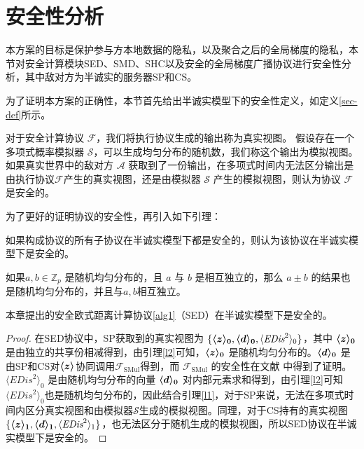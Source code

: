 \section{安全性分析}\label{4-analysis}
本方案的目标是保护参与方本地数据的隐私，以及聚合之后的全局梯度的隐私，本节对安全计算模块SED、SMD、SHC以及安全的全局梯度广播协议进行安全性分析，其中敌对方为半诚实的服务器SP和CS。

为了证明本方案的正确性，本节首先给出半诚实模型下的安全性定义，如定义\ref{sec-def}所示。

\begin{definition}\label{sec-def}	
	对于安全计算协议 $\mathcal{F}$，我们将执行协议生成的输出称为真实视图。
	假设存在一个多项式概率模拟器 $\mathcal{S}$，可以生成均匀分布的随机数，我们称这个输出为模拟视图。如果真实世界中的敌对方 $\mathcal{A}$ 获取到了一份输出，在多项式时间内无法区分输出是由执行协议$\mathcal{F}$产生的真实视图，还是由模拟器 $\mathcal{S}$ 产生的模拟视图，则认为协议 $\mathcal{F}$ 是安全的。
\end{definition}

为了更好的证明协议的安全性，再引入如下引理：
\begin{lemma}\label{l1}
	如果构成协议的所有子协议在半诚实模型下都是安全的，则认为该协议在半诚实模型下是安全的\cite{bi2020design}。
\end{lemma}

\begin{lemma}\label{l2}
	如果$ a, b \in \mathbb{Z}_p$ 是随机均匀分布的，且 $a$ 与 $b$ 是相互独立的，那么 $a \pm b$ 的结果也是随机均匀分布的，并且与$a,b$相互独立\cite{bogdanov2008sharemind}。
\end{lemma}

\begin{theorem}
	本章提出的安全欧式距离计算协议\ref{alg1}（SED）在半诚实模型下是安全的。
\end{theorem}

\begin{proof}\label{p1}
	在SED协议中，SP获取到的真实视图为 $\{\svec[0]{z}, \svec[0]{d}, \langle \textit{EDis}^2\rangle_0\}$，其中 $\svec[0]{z}$ 是由独立的共享份相减得到，由引理\ref{l2}可知，$\svec[0]{z}$ 是随机均匀分布的。$\svec[0]{d}$ 是由SP和CS对$\svec{z}$协同调用$\mathcal{F}_{\text {SMul}}$得到，而 $\mathcal{F}_{\text {SMul}}$ 的安全性在文献 \cite{rathee2021sirnn} 中得到了证明。$\langle \textit{EDis}^2\rangle_0$ 是由随机均匀分布的向量 $\svec[0]{d}$ 对内部元素求和得到，由引理\ref{l2}可知$\langle \textit{EDis}^2\rangle_0$也是随机均匀分布的，因此结合引理\ref{l1}，对于SP来说，无法在多项式时间内区分真实视图和由模拟器$\mathcal{S}$生成的模拟视图。同理，对于CS持有的真实视图 $\{\svec[1]{z}, \svec[1]{d}, \langle \textit{EDis}^2\rangle_1\}$，也无法区分于随机生成的模拟视图，所以SED协议在半诚实模型下是安全的。
\end{proof}

